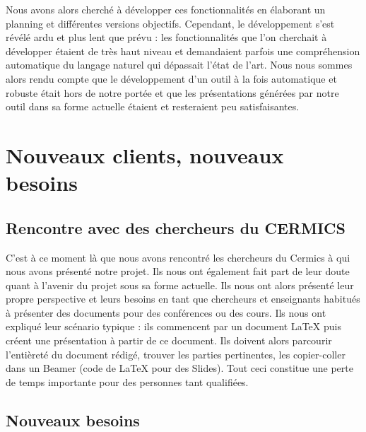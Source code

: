 \documentclass[12pt]{article}
\begin{document}
Nous avons alors cherché à développer ces fonctionnalités en élaborant un planning et différentes versions objectifs. Cependant, le développement s'est révélé ardu et plus lent que prévu : les fonctionnalités que l'on cherchait à développer étaient de très haut niveau et demandaient parfois une compréhension automatique du langage naturel qui dépassait l'état de l'art. Nous nous sommes alors rendu compte que le développement d'un outil à la fois automatique et robuste était hors de notre portée et que les présentations générées par notre outil dans sa forme actuelle étaient et resteraient peu satisfaisantes.

\section{Nouveaux clients, nouveaux besoins}

\subsection{Rencontre avec des chercheurs du CERMICS}
C'est à ce moment là que nous avons rencontré les chercheurs du Cermics à qui nous avons présenté notre projet. Ils nous ont également fait part de leur doute quant à l'avenir du projet sous sa forme actuelle. Ils nous ont alors présenté leur propre perspective et leurs besoins en tant que chercheurs et enseignants habitués à présenter des documents pour des conférences ou des cours. Ils nous ont expliqué leur scénario typique : ils commencent par un document LaTeX puis créent une présentation à partir de ce document. Ils doivent alors parcourir l'entièreté du document rédigé, trouver les parties pertinentes, les copier-coller dans un Beamer (code de LaTeX pour des Slides). Tout ceci constitue une perte de temps importante pour des personnes tant qualifiées.

\subsection{Nouveaux besoins}
\end{document}
